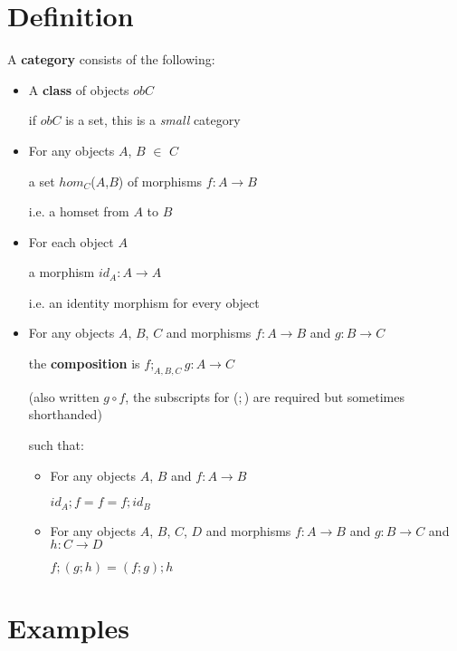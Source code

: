 \documentclass[../main.tex]{subfiles}
\begin{document}
\section{Definition}

A \textbf{category} consists of the following:

\begin{itemize}
  \item A \textbf{class} of objects $obC$

        if $obC$ is a set, this is a \textit{small} category

  \item For any objects $A$, $B$ $\in$ $C$ \par
        a set $hom_C$($A$,$B$) of morphisms $f : A \rightarrow B$

        i.e. a homset from $A$ to $B$

  \item For each object $A$ \par
        a morphism $id_A : A \rightarrow A$

        i.e. an identity morphism for every object

  \item For any objects $A$, $B$, $C$ and morphisms $f : A \rightarrow B$ and $g : B \rightarrow C$ \par
        the \textbf{composition} is $f ;_{A,B,C} g : A \rightarrow C$

        (also written $g \circ f$, the subscripts for ($;$) are required but sometimes shorthanded)

        such that:
\begin{itemize}
  \item For any objects $A$, $B$ and $f : A \rightarrow B$ \par
        $id_A ; f = f = f ; id_B$ 

  \item For any objects $A$, $B$, $C$, $D$ and morphisms $f : A \rightarrow B$ and $g : B \rightarrow C$ and $h : C \rightarrow D$ \par
        $f ; (g ; h) = (f ; g) ; h$ 
\end{itemize}
\end{itemize}

\section{Examples}
\end{document}
